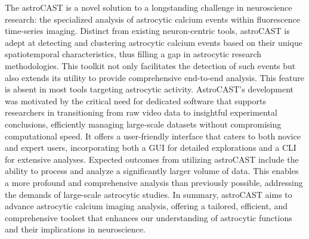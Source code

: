 The \ac{astroCAST} is a novel solution to a longstanding challenge in neuroscience research: the specialized analysis of astrocytic calcium events within fluorescence time-series imaging. Distinct from existing neuron-centric tools, \ac{astroCAST} is adept at detecting and clustering astrocytic calcium events based on their unique spatiotemporal characteristics, thus filling a gap in astrocytic research methodologies. This toolkit not only facilitates the detection of such events but also extends its utility to provide comprehensive end-to-end analysis. This feature is absent in most tools targeting astrocytic activity. AstroCAST's development was motivated by the critical need for dedicated software that supports researchers in transitioning from raw video data to insightful experimental conclusions, efficiently managing large-scale datasets without compromising computational speed. It offers a user-friendly interface that caters to both novice and expert users, incorporating both a \ac{GUI} for detailed explorations and a \ac{CLI} for extensive analyses. Expected outcomes from utilizing \ac{astroCAST} include the ability to process and analyze a significantly larger volume of data. This enables a more profound and comprehensive analysis than previously possible, addressing the demands of large-scale astrocytic studies. In summary, \ac{astroCAST} aims to advance astrocytic calcium imaging analysis, offering a tailored, efficient, and comprehensive toolset that enhances our understanding of astrocytic functions and their implications in neuroscience.